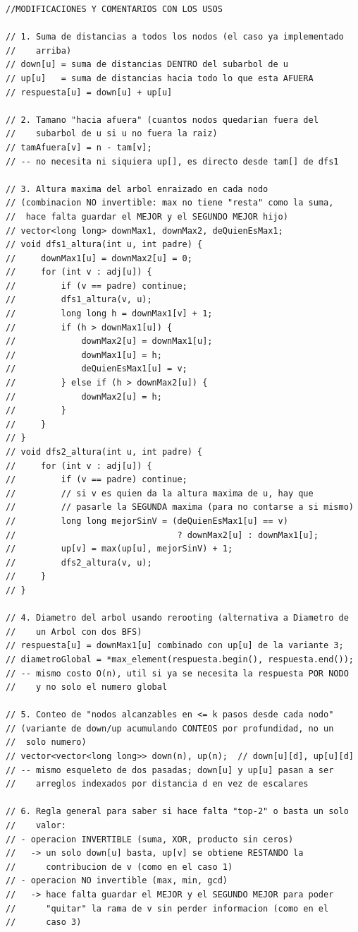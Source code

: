 \documentclass[10pt,a4paper,twocolumn]{article}
\begin{document}
\begin{lstlisting}[style=cpp]
//MODIFICACIONES Y COMENTARIOS CON LOS USOS

// 1. Suma de distancias a todos los nodos (el caso ya implementado
//    arriba)
// down[u] = suma de distancias DENTRO del subarbol de u
// up[u]   = suma de distancias hacia todo lo que esta AFUERA
// respuesta[u] = down[u] + up[u]

// 2. Tamano "hacia afuera" (cuantos nodos quedarian fuera del
//    subarbol de u si u no fuera la raiz)
// tamAfuera[v] = n - tam[v];
// -- no necesita ni siquiera up[], es directo desde tam[] de dfs1

// 3. Altura maxima del arbol enraizado en cada nodo
// (combinacion NO invertible: max no tiene "resta" como la suma,
//  hace falta guardar el MEJOR y el SEGUNDO MEJOR hijo)
// vector<long long> downMax1, downMax2, deQuienEsMax1;
// void dfs1_altura(int u, int padre) {
//     downMax1[u] = downMax2[u] = 0;
//     for (int v : adj[u]) {
//         if (v == padre) continue;
//         dfs1_altura(v, u);
//         long long h = downMax1[v] + 1;
//         if (h > downMax1[u]) {
//             downMax2[u] = downMax1[u];
//             downMax1[u] = h;
//             deQuienEsMax1[u] = v;
//         } else if (h > downMax2[u]) {
//             downMax2[u] = h;
//         }
//     }
// }
// void dfs2_altura(int u, int padre) {
//     for (int v : adj[u]) {
//         if (v == padre) continue;
//         // si v es quien da la altura maxima de u, hay que
//         // pasarle la SEGUNDA maxima (para no contarse a si mismo)
//         long long mejorSinV = (deQuienEsMax1[u] == v)
//                                ? downMax2[u] : downMax1[u];
//         up[v] = max(up[u], mejorSinV) + 1;
//         dfs2_altura(v, u);
//     }
// }

// 4. Diametro del arbol usando rerooting (alternativa a Diametro de
//    un Arbol con dos BFS)
// respuesta[u] = downMax1[u] combinado con up[u] de la variante 3;
// diametroGlobal = *max_element(respuesta.begin(), respuesta.end());
// -- mismo costo O(n), util si ya se necesita la respuesta POR NODO
//    y no solo el numero global

// 5. Conteo de "nodos alcanzables en <= k pasos desde cada nodo"
// (variante de down/up acumulando CONTEOS por profundidad, no un
//  solo numero)
// vector<vector<long long>> down(n), up(n);  // down[u][d], up[u][d]
// -- mismo esqueleto de dos pasadas; down[u] y up[u] pasan a ser
//    arreglos indexados por distancia d en vez de escalares

// 6. Regla general para saber si hace falta "top-2" o basta un solo
//    valor:
// - operacion INVERTIBLE (suma, XOR, producto sin ceros)
//   -> un solo down[u] basta, up[v] se obtiene RESTANDO la
//      contribucion de v (como en el caso 1)
// - operacion NO invertible (max, min, gcd)
//   -> hace falta guardar el MEJOR y el SEGUNDO MEJOR para poder
//      "quitar" la rama de v sin perder informacion (como en el
//      caso 3)
\end{lstlisting}
\end{document}
